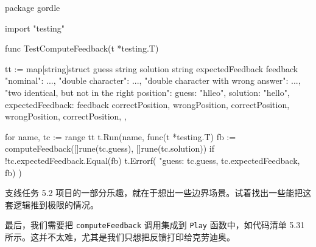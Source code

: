 \begin{gocode}[title={代码清单 5.30 game\_internal\_test.go：\texttt{computeFeedback()} 测试}]
package gordle

import "testing"

func TestComputeFeedback(t *testing.T) {
    tt := map[string]struct {
        guess             string
        solution          string
        expectedFeedback feedback
    }{
        "nominal": {...},
        "double character": {...},
        "double character with wrong answer": {...},
        "two identical, but not in the right position": {
            guess:    "hlleo",
            solution: "hello",
            expectedFeedback: feedback{
                correctPosition,
                wrongPosition,
                correctPosition,
                wrongPosition,
                correctPosition},
        },
    }

    for name, tc := range tt {
        t.Run(name, func(t *testing.T) {
            fb := computeFeedback([]rune(tc.guess), []rune(tc.solution))
            if !tc.expectedFeedback.Equal(fb) {
                t.Errorf(
                    "guess: %
                    tc.guess, tc.expectedFeedback, fb)
            }
        })
    }
}
\end{gocode}

\begin{infobox}{支线任务 5.2}
项目的一部分乐趣，就在于想出一些边界场景。试着找出一些能把这套逻辑推到极限的情况。
\end{infobox}

最后，我们需要把 \texttt{computeFeedback} 调用集成到 \texttt{Play} 函数中，如代码清单 5.31 所示。这并不太难，尤其是我们只想把反馈打印给克劳迪奥。


